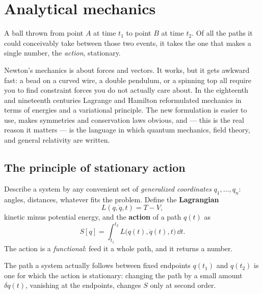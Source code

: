 \chapter{Analytical mechanics}
\label{ch:analytical}



\begin{prototype}
A ball thrown from point $A$ at time $t_1$ to point $B$ at time $t_2$. Of all the paths it could conceivably take between those two events, it takes the one that makes a single number, the \emph{action}, stationary.
\end{prototype}

Newton's mechanics is about forces and vectors. It works, but it gets awkward fast: a bead on a curved wire, a double pendulum, or a spinning top all require you to find constraint forces you do not actually care about. In the eighteenth and nineteenth centuries Lagrange and Hamilton reformulated mechanics in terms of energies and a variational principle. The new formulation is easier to use, makes symmetries and conservation laws obvious, and --- this is the real reason it matters --- is the language in which quantum mechanics, field theory, and general relativity are written.

\section{The principle of stationary action}

Describe a system by any convenient set of \emph{generalized coordinates} $q_1,\dots,q_n$: angles, distances, whatever fits the problem. Define the \textbf{Lagrangian}
\[
  L(q,\dot q,t) = T - V,
\]
kinetic minus potential energy, and the \textbf{action} of a path $q(t)$ as
\[
  S[q] = \int_{t_1}^{t_2} L\big(q(t),\dot q(t),t\big)\,\dd t .
\]
The action is a \emph{functional}: feed it a whole path, and it returns a number.

\begin{law}
The path a system actually follows between fixed endpoints $q(t_1)$ and $q(t_2)$ is one for which the action is stationary: changing the path by a small amount $\delta q(t)$, vanishing at the endpoints, changes $S$ only at second order.
\end{law}

